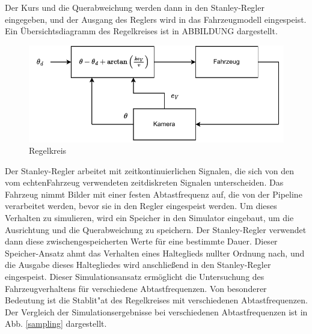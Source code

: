 \documentclass[arbeit=studie,oneside,BCOR=12mm]{ArbeitRST}
\begin{document}
Der Kurs und die Querabweichung werden dann in den Stanley-Regler eingegeben,
und der Ausgang des Reglers wird in das Fahrzeugmodell eingespeist. Ein
Übersichtsdiagramm des Regelkreises ist in ABBILDUNG dargestellt.

\begin{figure}[h]
    \centering
    \includegraphics{control_loop}
    \caption{Regelkreis}
    \label{control_loop}
\end{figure}

Der Stanley-Regler arbeitet mit zeitkontinuierlichen Signalen, die sich von den
vom \glqq echten\grqq Fahrzeug verwendeten zeitdiskreten Signalen
unterscheiden. Das Fahrzeug nimmt Bilder mit einer festen Abtastfrequenz auf,
die von der Pipeline verarbeitet werden, bevor sie in den Regler eingespeist
werden. Um dieses Verhalten zu simulieren, wird ein Speicher in den Simulator
eingebaut, um die Ausrichtung und die Querabweichung zu speichern. Der
Stanley-Regler verwendet dann diese zwischengespeicherten Werte für eine
bestimmte Dauer. Dieser Speicher-Ansatz ahmt das Verhalten eines Halteglieds
nullter Ordnung nach, und die Ausgabe dieses Haltegliedes wird anschließend in
den Stanley-Regler eingespeist. Dieser Simulationsansatz ermöglicht die
Untersuchung des Fahrzeugverhaltens für verschiedene Abtastfrequenzen. Von
besonderer Bedeutung ist die Stablit"at des Regelkreises mit verschiedenen
Abtastfrequenzen. Der Vergleich der Simulationsergebnisse bei
verschiedenen Abtastfrequenzen ist in Abb. \ref{sampling} dargestellt. 
\end{document}
